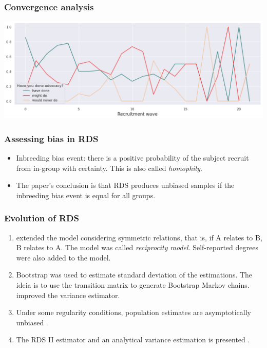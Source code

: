 \documentclass{beamer}
\newcommand{\Space}{\vspace{3ex}}
\begin{document}
\begin{frame}
  \frametitle{Convergence analysis}

  \includegraphics[width=\textwidth]{../../images/recruitment-wave-convergence.png}
\end{frame}

\begin{frame}
  \frametitle{Assessing bias in RDS}

  \begin{itemize}
    \justifying

    \item Inbreeding bias event: there is a positive probability of the subject recruit
  from in-group with certainty. This is also called {\em homophily}.

    \Space 

    \item The paper's conclusion is that RDS produces unbiased samples if the
    inbreeding bias event is equal for all groups.
  \end{itemize}

\end{frame}

\begin{frame}
  \frametitle{Evolution of RDS}

  \begin{enumerate}
    \justifying

    \item<1> \cite{heckathorn2002respondent} extended the model considering symmetric
    relations, that is, if A relates to B, B relates to A. The model was
    called {\em reciprocity model}. Self-reported degrees were also added to
    the model. 

    \item<2> Bootstrap was used to estimate standard deviation of the
    estimations. The ideia is to use the transition matrix to generate Bootstrap
    Markov chains. \cite{salganik2006variance} improved the variance estimator.
    
    \item<3> Under some regularity conditions, population estimates are
    asymptotically unbiased \cite{salganik2004sampling}.    
    
    \item<4> The RDS II estimator and an analytical variance estimation is
    presented \cite{volz2008probability}.
  \end{enumerate}

\end{frame}
\end{document}
